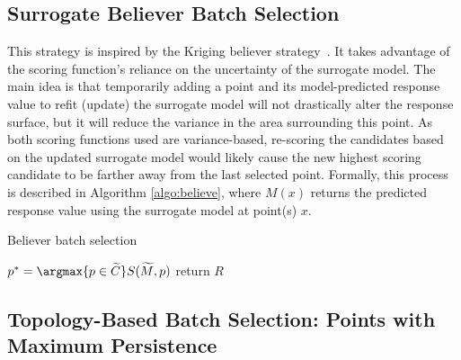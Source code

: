 \subsection{Surrogate Believer Batch Selection}
This strategy is inspired by the Kriging believer strategy~\cite{GotovosCasatiHitz2013,GinsbourgerLeRicheCarraro2009}.
%
It takes advantage of the scoring function's reliance on the uncertainty of the surrogate model.
%
The main idea is that temporarily adding a point and its model-predicted response value to refit (update) the surrogate model will not drastically alter the response surface, but it will reduce the variance in the area surrounding this point.
%
As both scoring functions used are variance-based, re-scoring the candidates based on the updated surrogate model would likely cause the new highest scoring candidate to be farther away from the last selected point.
%
Formally, this process is described in Algorithm \ref{algo:believe}, where $M(x)$ returns the predicted response value using the surrogate model at point(s) $x$.

{\fontsize{10}{10}\selectfont
\begin{algorithm}
\scriptsize
\caption{Believer batch selection}
\label{algo:believe}
\begin{algorithmic}
  \State $p^* = \argmax{p \in \widetilde{C}} S(\widetilde{M}, p)$
\EndWhile
\State return $R$
\EndProcedure
\end{algorithmic}
\end{algorithm}
}

\subsection{Topology-Based Batch Selection: Points with\\Maximum Persistence}
\label{subsection:topology-maxp}


